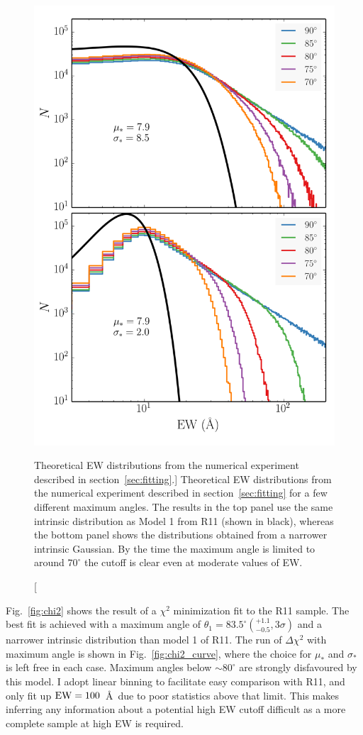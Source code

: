 \begin{figure}
\centering
\includegraphics[width=1.0\textwidth]{figures/ewpaper/cutoff.png}
\caption
[Theoretical EW distributions from the numerical experiment 
described in section~\ref{sec:fitting}.]
{
Theoretical EW distributions from the numerical experiment 
described in section~\ref{sec:fitting} for a few different 
maximum angles. The results in the top panel use the same intrinsic
distribution as Model 1 from R11 (shown in black), 
whereas the bottom panel shows the distributions 
obtained from a narrower intrinsic Gaussian. By the time the maximum
angle is limited to around $70^\circ$ the cutoff is
clear even at moderate values of EW.
}
\label{fig:cutoff}
\end{figure}

Fig.~\ref{fig:chi2} shows the result of a $\chi^2$ minimization fit 
to the R11 sample. The best fit is achieved with a maximum angle of 
$\theta_{1}=83.5^\circ(^{+1.1}_{-0.5}, 3\sigma)$ and a narrower intrinsic distribution
than model 1 of R11. The run of $\Delta \chi^2$ with maximum angle
is shown in Fig.~\ref{fig:chi2_curve}, where the choice for $\mu_*$
and $\sigma_*$ is left free in each case. 
Maximum angles below $\sim80^\circ$ are strongly disfavoured
by this model. I adopt linear binning to facilitate easy comparison 
with R11, and only fit up ${\rm EW}=100$~\AA\
due to poor statistics above that limit. This 
makes inferring any information about a potential high EW cutoff 
difficult as a more complete sample at high EW is required. 

